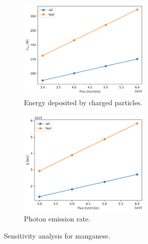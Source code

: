 \begin{figure}[htbp!] %
  \centering
  \begin{subfigure}[b]{0.49\textwidth}
    \centering
    \includegraphics[width=0.7\textwidth]{figures/fast-res25_hch}
    \caption{Energy deposited by charged particles.}
  \end{subfigure}
  \hfill
  \begin{subfigure}[b]{0.49\textwidth}
    \centering
    \includegraphics[width=0.7\textwidth]{figures/fast-res25_Si}
    \caption{Photon emission rate.}
  \end{subfigure}
  \hfill
  \caption{Sensitivity analysis for manganese.}
  \label{fig:sens-mn}
\end{figure}

